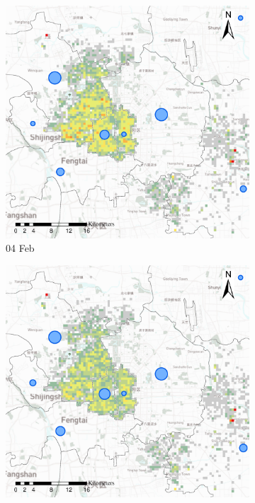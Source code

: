\documentclass[preprints,article,accept,moreauthors,pdftex]{Definitions/mdpi}
\begin{document}
\begin{figure}[ht]
    \vspace{6pt}
    \begin{subfigure}{.3\textwidth}
        \includegraphics[width=\textwidth]{Figures/Relation_with_confrimed_cases/NewDistrictSSBD2020_02_04.eps}
        \caption{04 Feb}
    \end{subfigure}
    \begin{subfigure}{.3\textwidth}
        \includegraphics[width=\textwidth]{Figures/Relation_with_confrimed_cases/NewDistrictSSBD2020_02_08.eps}

\end{subfigure}
\end{figure}
\end{document}
